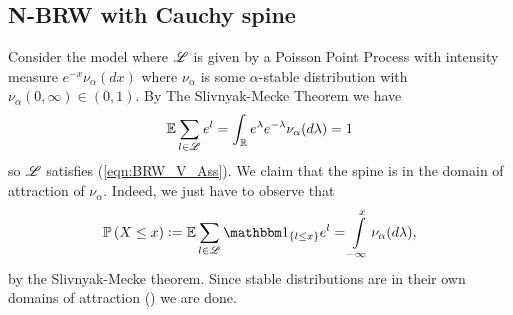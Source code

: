 






\subsection{N-BRW with Cauchy spine}
Consider the model where $\mathscr{L}$ is given by a Poisson Point Process with intensity measure $e^{-x} \nu_\alpha (dx)$ where $\nu_\alpha$ is some $\alpha$-stable distribution with $\nu_\alpha(0, \infty) \in (0, 1)$. By The Slivnyak-Mecke Theorem \cite[Theorem 1.13]{baccelli2009stochastic} we have
\begin{equation}\nonumber
\mathbb{E} \sum\limits_{l \in \mathscr{L}} e^l = \int_{\mathbb{R}} e^\lambda e^{-\lambda} \nu_\alpha(d\lambda) = 1
\end{equation}
so $\mathscr{L}$ satisfies (\ref{eqn:BRW_V_Ass}). We claim that the spine is in the domain of attraction of $\nu_\alpha$. Indeed, we just have to observe that 
\begin{equation}
\Pr{X \leq x} \defeq \E \sum\limits_{l \in \scr{L}} \Ind_{\{ l \leq x \}} e^l  = \int\limits^x_{-\infty} \nu_\alpha(d \lambda), 
\end{equation}
 by the Slivnyak-Mecke theorem. Since stable distributions are in their own domains of attraction (\cite[p. 576]{feller1957introduction}) we are done. 

